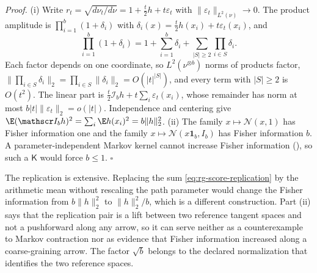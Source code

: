 \noindent\emph{Proof.}
(i) Write \(r_t=\sqrt{d\nu_t/d\nu}=1+\tfrac t2h+t\varepsilon_t\) with
\(\lVert\varepsilon_t\rVert_{L^2(\nu)}\to0\). The product amplitude is
\(\prod_{i=1}^b(1+\delta_i)\) with
\(\delta_i(x)=\tfrac t2h(x_i)+t\varepsilon_t(x_i)\), and
\begin{equation}
\prod_{i=1}^b(1+\delta_i)
=1+\sum_{i=1}^b\delta_i
+\sum_{\lvert S\rvert\geq2}\prod_{i\in S}\delta_i .
\label{eq:rg-product-amplitude-expansion}
\end{equation}
Each factor depends on one coordinate, so \(L^2(\nu^{\otimes b})\) norms of products
factor, \(\lVert\prod_{i\in S}\delta_i\rVert_2=\prod_{i\in S}\lVert\delta_i\rVert_2
=O(\lvert t\rvert^{\lvert S\rvert})\), and every term with \(\lvert S\rvert\geq2\) is
\(O(t^2)\). The linear part is \(\tfrac t2\mathscr I_bh+t\sum_i\varepsilon_t(x_i)\),
whose remainder has norm at most \(b\lvert t\rvert\lVert\varepsilon_t\rVert_2
=o(\lvert t\rvert)\). Independence and centering give
\(\E(\mathscr I_bh)^2=\sum_i\E h(x_i)^2=b\lVert h\rVert_2^2\).
(ii) The family \(x\mapsto\mathcal N(x,1)\) has Fisher information one and the family
\(x\mapsto\mathcal N(x\mathbf 1_b,I_b)\) has Fisher information \(b\). A
parameter-independent Markov kernel cannot increase Fisher information
(), so such a \(\mathsf K\) would force \(b\leq1\).
\hfill$\square$

\medskip
The replication is extensive. Replacing the sum \eqref{eq:rg-score-replication} by the
arithmetic mean without rescaling the path parameter would change the Fisher
information from \(b\lVert h\rVert_2^2\) to \(\lVert h\rVert_2^2/b\), which is a different
construction. Part (ii) says that the replication pair is a lift between two
reference tangent spaces and not a pushforward along any arrow, so it can serve
neither as a counterexample to Markov contraction nor as evidence that Fisher
information increased along a coarse-graining arrow. The factor \(\sqrt b\) belongs to
the declared normalization that identifies the two reference spaces.

